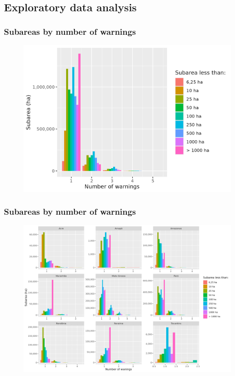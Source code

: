 \documentclass[aspectratio=169]{beamer}
\begin{document}
\subsection{Exploratory data analysis}

\begin{frame}
    \frametitle{Subareas by number of warnings}
    \begin{figure}[h]
        \includegraphics[width=0.70\linewidth]
        {./figures/plot_deter_subarea_by_nwarnings.png}
    \end{figure}
\end{frame}

\begin{frame}
    \frametitle{Subareas by number of warnings}
    \begin{figure}[h]
        \includegraphics[width=0.70\linewidth]
        {./figures/plot_deter_subarea_by_warnings_state.png}
    \end{figure}
\end{frame}
\end{document}
